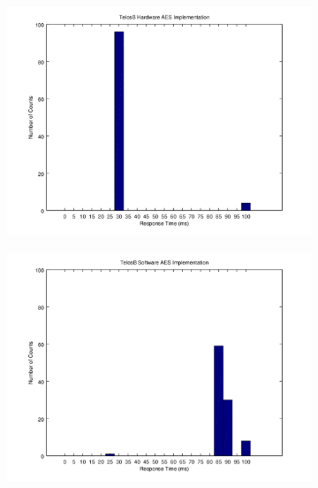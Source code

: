 \begin{figure}[ht!]
	\begin{subfigure}{.5\textwidth}
		\centering
		\includegraphics[width=1\linewidth]{fig/noncoresec_ping_telosb_hw.png}
	\end{subfigure}
	\begin{subfigure}{.5\textwidth}
		\centering
		\includegraphics[width=1\linewidth]{fig/noncoresec_ping_telosb_sw.png}
	\end{subfigure}
	\begin{subfigure}{.5\textwidth}
		\centering

\end{subfigure}
\end{figure}
